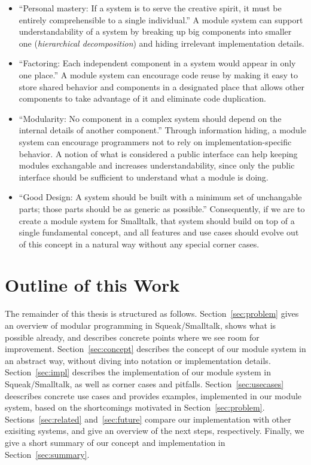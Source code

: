\begin{itemize}
	\item ``Personal mastery: If a system is to serve the creative spirit, it must be entirely comprehensible to a single individual.'' A module system can support understandability of a system by breaking up big components into smaller one (\emph{hierarchical decomposition}) and hiding irrelevant implementation details.
	\item ``Factoring: Each independent component in a system would appear in only one place.'' A module system can encourage code reuse by making it easy to store shared behavior and components in a designated place that allows other components to take advantage of it and eliminate code duplication.
	\item ``Modularity: No component in a complex system should depend on the internal details of another component.'' Through information hiding, a module system can encourage programmers not to rely on implementation-specific behavior. A notion of what is considered a public interface can help keeping modules exchangable and increases understandability, since only the public interface should be sufficient to understand what a module is doing.
	\item ``Good Design: A system should be built with a minimum set of unchangable parts; those parts should be as generic as possible.'' Consequently, if we are to create a module system for Smalltalk, that system should build on top of a single fundamental concept, and all features and use cases should evolve out of this concept in a natural way without any special corner cases.
\end{itemize}

\section{Outline of this Work}
The remainder of this thesis is structured as follows. Section~\ref{sec:problem} gives an overview of modular programming in Squeak/Smalltalk, shows what is possible already, and describes concrete points where we see room for improvement. Section~\ref{sec:concept} describes the concept of our module system in an abstract way, without diving into notation or implementation details. Section~\ref{sec:impl} describes the implementation of our module system in Squeak/Smalltalk, as well as corner cases and pitfalls. Section~\ref{sec:usecases} deescribes concrete use cases and provides examples, implemented in our module system, based on the shortcomings motivated in Section~\ref{sec:problem}. Sections~\ref{sec:related} and~\ref{sec:future} compare our implementation with other exisiting systems, and give an overview of the next steps, respectively. Finally, we give a short summary of our concept and implementation in Section~\ref{sec:summary}.
